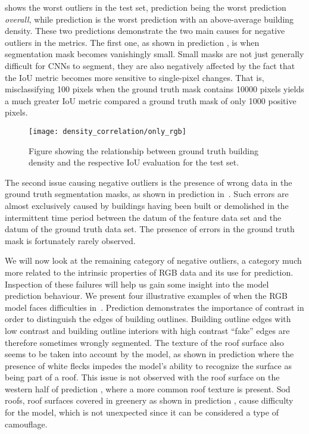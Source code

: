  shows the worst outliers in the test set, prediction  being the worst prediction \emph{overall}, while prediction  is the worst prediction with an above-average building density. %
These two predictions demonstrate the two main causes for negative outliers in the metrics.
The first one, as shown in prediction , is when segmentation mask becomes vanishingly small.
Small masks are not just generally difficult for CNNs to segment, they are also negatively affected by the fact that the IoU metric becomes more sensitive to single-pixel changes.
That is, misclassifying 100 pixels when the ground truth mask contains \num{10000} pixels yields a much greater IoU metric compared a ground truth mask of only \num{1000} positive pixels.

\begin{figure}[H]
  \texttt{[image: density\_correlation/only\_rgb]}
  \caption{%
    Figure showing the relationship between ground truth building density and the respective IoU evaluation for the test set.
  }%
  \label{fig:rgb-density-relationship}
\end{figure}

The second issue causing negative outliers is the presence of wrong data in the ground truth segmentation masks, as shown in prediction  in~.
Such errors are almost exclusively caused by buildings having been built or demolished in the intermittent time period between the datum of the feature data set and the datum of the ground truth data set.
The presence of errors in the ground truth mask is fortunately rarely observed.

We will now look at the remaining category of negative outliers, a category much more related to the intrinsic properties of RGB data and its use for prediction.
Inspection of these failures will help us gain some insight into the model prediction behaviour.
We present four illustrative examples of when the RGB model faces difficulties in~.
Prediction  demonstrates the importance of contrast in order to distinguish the edges of building outlines.
Building outline edges with low contrast and building outline interiors with high contrast \enquote{fake} edges are therefore sometimes wrongly segmented.
The texture of the roof surface also seems to be taken into account by the model, as shown in prediction  where the presence of white flecks impedes the model's ability to recognize the surface as being part of a roof.
This issue is not observed with the roof surface on the western half of prediction , where a more common roof texture is present.
Sod roofs, roof surfaces covered in greenery as shown in prediction , cause difficulty for the model, which is not unexpected since it can be considered a type of camouflage.

